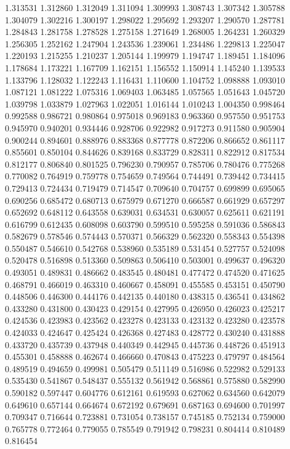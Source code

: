 1.313531
1.312860
1.312049
1.311094
1.309993
1.308743
1.307342
1.305788
1.304079
1.302216
1.300197
1.298022
1.295692
1.293207
1.290570
1.287781
1.284843
1.281758
1.278528
1.275158
1.271649
1.268005
1.264231
1.260329
1.256305
1.252162
1.247904
1.243536
1.239061
1.234486
1.229813
1.225047
1.220193
1.215255
1.210237
1.205144
1.199979
1.194747
1.189451
1.184096
1.178684
1.173221
1.167709
1.162151
1.156552
1.150914
1.145240
1.139533
1.133796
1.128032
1.122243
1.116431
1.110600
1.104752
1.098888
1.093010
1.087121
1.081222
1.075316
1.069403
1.063485
1.057565
1.051643
1.045720
1.039798
1.033879
1.027963
1.022051
1.016144
1.010243
1.004350
0.998464
0.992588
0.986721
0.980864
0.975018
0.969183
0.963360
0.957550
0.951753
0.945970
0.940201
0.934446
0.928706
0.922982
0.917273
0.911580
0.905904
0.900244
0.894601
0.888976
0.883368
0.877778
0.872206
0.866652
0.861117
0.855601
0.850104
0.844626
0.839168
0.833729
0.828311
0.822912
0.817534
0.812177
0.806840
0.801525
0.796230
0.790957
0.785706
0.780476
0.775268
0.770082
0.764919
0.759778
0.754659
0.749564
0.744491
0.739442
0.734415
0.729413
0.724434
0.719479
0.714547
0.709640
0.704757
0.699899
0.695065
0.690256
0.685472
0.680713
0.675979
0.671270
0.666587
0.661929
0.657297
0.652692
0.648112
0.643558
0.639031
0.634531
0.630057
0.625611
0.621191
0.616799
0.612435
0.608098
0.603790
0.599510
0.595258
0.591036
0.586843
0.582679
0.578546
0.574443
0.570371
0.566329
0.562320
0.558343
0.554398
0.550487
0.546610
0.542768
0.538960
0.535189
0.531454
0.527757
0.524098
0.520478
0.516898
0.513360
0.509863
0.506410
0.503001
0.499637
0.496320
0.493051
0.489831
0.486662
0.483545
0.480481
0.477472
0.474520
0.471625
0.468791
0.466019
0.463310
0.460667
0.458091
0.455585
0.453151
0.450790
0.448506
0.446300
0.444176
0.442135
0.440180
0.438315
0.436541
0.434862
0.433280
0.431800
0.430423
0.429154
0.427995
0.426950
0.426023
0.425217
0.424536
0.423983
0.423562
0.423278
0.423133
0.423132
0.423280
0.423578
0.424033
0.424647
0.425424
0.426368
0.427483
0.428772
0.430240
0.431888
0.433720
0.435739
0.437948
0.440349
0.442945
0.445736
0.448726
0.451913
0.455301
0.458888
0.462674
0.466660
0.470843
0.475223
0.479797
0.484564
0.489519
0.494659
0.499981
0.505479
0.511149
0.516986
0.522982
0.529133
0.535430
0.541867
0.548437
0.555132
0.561942
0.568861
0.575880
0.582990
0.590182
0.597447
0.604776
0.612161
0.619593
0.627062
0.634560
0.642079
0.649610
0.657144
0.664674
0.672192
0.679691
0.687163
0.694600
0.701997
0.709347
0.716644
0.723881
0.731054
0.738157
0.745185
0.752134
0.759000
0.765778
0.772464
0.779055
0.785549
0.791942
0.798231
0.804414
0.810489
0.816454
